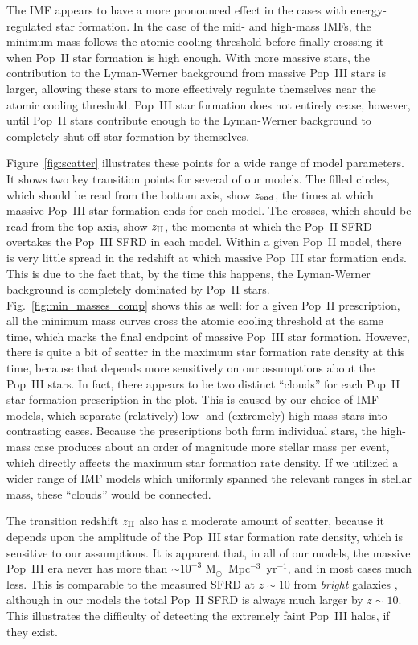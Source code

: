 \documentclass[a4paper,fleqn,usenatbib]{mnras}
\begin{document}
The IMF appears to have a more pronounced effect in the cases with energy-regulated star formation. In the case of the mid- and high-mass IMFs, the minimum mass follows the atomic cooling threshold before finally crossing it when Pop~II star formation is high enough. With more massive stars, the contribution to the Lyman-Werner background from massive Pop~III stars is larger, allowing these stars to more effectively regulate themselves near the atomic cooling threshold. Pop~III star formation does not entirely cease, however, until Pop~II stars contribute enough to the Lyman-Werner background to completely shut off star formation by themselves. 


Figure~\ref{fig:scatter} illustrates these points for a wide range of model parameters. It shows two key transition points for several of our models. The filled circles, which should be read from the bottom axis, show $z_{\rm end}$, the times at which massive Pop~III star formation ends for each model. The crosses, which should be read from the top axis, show $z_{\rm II}$, the moments at which the Pop~II SFRD overtakes the Pop~III SFRD in each model. Within a given Pop~II model, there is very little spread in the redshift at which massive Pop~III star formation ends. This is due to the fact that, by the time this happens, the Lyman-Werner background is completely dominated by Pop~II stars. Fig.~\ref{fig:min_masses_comp} shows this as well: for a given Pop~II prescription, all the minimum mass curves cross the atomic cooling threshold at the same time, which marks the final endpoint of massive Pop~III star formation. However, there is quite a bit of scatter in the maximum star formation rate density at this time, because that depends more sensitively on our assumptions about the Pop~III stars. In fact, there appears to be two distinct ``clouds'' for each Pop~II star formation prescription in the plot. 
This is caused by our choice of IMF models, which separate (relatively) low- and (extremely) high-mass stars into contrasting cases. Because the prescriptions both form individual stars, the high-mass case produces about an order of magnitude more stellar mass per event, which directly affects the maximum star formation rate density. If we utilized a wider range of IMF models which uniformly spanned the relevant ranges in stellar mass, these ``clouds'' would be connected.

The transition redshift $z_{\rm II}$ also has a moderate amount of scatter, because it depends upon the amplitude of the Pop~III star formation rate density, which is sensitive to our assumptions. It is apparent that, in all of our models, the massive Pop~III era never has more than $\sim 10^{-3}$ M$_\odot$~Mpc$^{-3}$~yr$^{-1}$, and in most cases much less. 
This is comparable to the measured SFRD at $z \sim 10$ from \emph{bright} galaxies \citep[][]{zheng_2012, coe_2013, oesch_2014, mcleod_2015, atek_2015}, although in our models the total Pop~II SFRD is always much larger by $z \sim 10$. This illustrates the difficulty of detecting the extremely faint Pop~III halos, if they exist.
\end{document}

